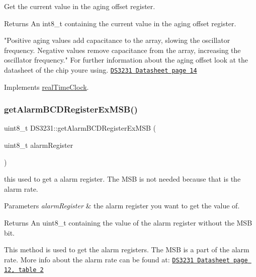 Get the current value in the aging offset register. 

\begin{DoxyReturn}{Returns}
An int8\+\_\+t containing the current value in the aging offset register.
\end{DoxyReturn}
"Positive aging values add capacitance to the array, slowing the oscillator frequency. Negative values remove capacitance from the array, increasing the oscillator frequency." For further information about the aging offset look at the datasheet of the chip you\textquotesingle{}re using. \href{https://datasheets.maximintegrated.com/en/ds/DS3231.pdf}{\tt D\+S3231 Datasheet page 14} 

Implements \mbox{\hyperlink{classreal_time_clock_a2bc081385a6ad8273201d66217f8b2f0}{real\+Time\+Clock}}.

\mbox{\label{class_d_s3231_a70033a61ca1965fa0aed9af31679355f}} 
\subsubsection{\texorpdfstring{get\+Alarm\+B\+C\+D\+Register\+Ex\+M\+S\+B()}{getAlarmBCDRegisterExMSB()}}
{\footnotesize\ttfamily uint8\+\_\+t D\+S3231\+::get\+Alarm\+B\+C\+D\+Register\+Ex\+M\+SB (\begin{DoxyParamCaption}\item[{uint8\+\_\+t}]{alarm\+Register }\end{DoxyParamCaption})\hspace{0.3cm}{\ttfamily [private]}}



this used to get a alarm register. The M\+SB is not needed because that is the alarm rate. 


\begin{DoxyParams}{Parameters}
{\em alarm\+Register} & the alarm register you want to get the value of. \\
\hline
\end{DoxyParams}
\begin{DoxyReturn}{Returns}
An uint8\+\_\+t containing the value of the alarm register without the M\+SB bit.
\end{DoxyReturn}
This method is used to get the alarm registers. The M\+SB is a part of the alarm rate. More info about the alarm rate can be found at\+: \href{https://datasheets.maximintegrated.com/en/ds/DS3231.pdf}{\tt D\+S3231 Datasheet page 12, table 2} \mbox{\label{class_d_s3231_a0b013c68f96b5145c1c9feb9270855a7}} 
